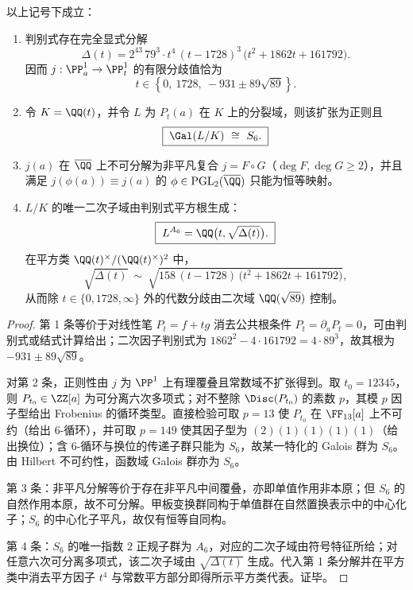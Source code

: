 \begin{theorem}\label{thm:xi-j-sextic-discriminant-s6-regular}
以上记号下成立：
\begin{enumerate}
  \item 判别式存在完全显式分解
  \[
  \boxed{\;
  \Delta(t)=2^{43}\,79^3\cdot t^{4}\,(t-1728)^{3}\,\bigl(t^2+1862t+161792\bigr).\;}
  \]
  因而 \(j:\PP^1_a\to\PP^1_t\) 的有限分歧值恰为
  \[
  t\in\left\{0,\ 1728,\ -931\pm 89\sqrt{89}\right\}.
  \]
  \item 令 \(K=\QQ(t)\)，并令 \(L\) 为 \(P_t(a)\) 在 \(K\) 上的分裂域，则该扩张为正则且
  \[
  \boxed{\;\Gal(L/K)\ \cong\ S_6.\;}
  \]
  \item \(j(a)\) 在 \(\overline{\QQ}\) 上不可分解为非平凡复合 \(j=F\circ G\)（\(\deg F,\deg G\ge2\)），并且满足 \(j(\phi(a))\equiv j(a)\) 的 \(\phi\in\mathrm{PGL}_2(\overline{\QQ})\) 只能为恒等映射。
  \item \(L/K\) 的唯一二次子域由判别式平方根生成：
  \[
  \boxed{\;L^{A_6}=\QQ\bigl(t,\sqrt{\Delta(t)}\bigr).\;}
  \]
  在平方类 \(\QQ(t)^\times/(\QQ(t)^\times)^2\) 中，
  \[
  \sqrt{\Delta(t)}\ \sim\ \sqrt{158\,(t-1728)\,\bigl(t^2+1862t+161792\bigr)},
  \]
  从而除 \(t\in\{0,1728,\infty\}\) 外的代数分歧由二次域 \(\QQ(\sqrt{89})\) 控制。
\end{enumerate}
\end{theorem}
\begin{proof}
第 1 条等价于对线性笔 \(P_t=f+t g\) 消去公共根条件 \(P_t=\partial_aP_t=0\)，可由判别式或结式计算给出；二次因子判别式为 \(1862^2-4\cdot161792=4\cdot 89^3\)，故其根为 \(-931\pm 89\sqrt{89}\)。
\par
对第 2 条，正则性由 \(j\) 为 \(\PP^1\) 上有理覆叠且常数域不扩张得到。取 \(t_0=12345\)，则 \(P_{t_0}\in\ZZ[a]\) 为可分离六次多项式；对不整除 \(\Disc(P_{t_0})\) 的素数 \(p\)，其模 \(p\) 因子型给出 Frobenius 的循环类型。直接检验可取 \(p=13\) 使 \(P_{t_0}\) 在 \(\FF_{13}[a]\) 上不可约（给出 \(6\)-循环），并可取 \(p=149\) 使其因子型为 \((2)(1)(1)(1)(1)\)（给出换位）；含 \(6\)-循环与换位的传递子群只能为 \(S_6\)，故某一特化的 Galois 群为 \(S_6\)。由 Hilbert 不可约性，函数域 Galois 群亦为 \(S_6\)。
\par
第 3 条：非平凡分解等价于存在非平凡中间覆叠，亦即单值作用非本原；但 \(S_6\) 的自然作用本原，故不可分解。甲板变换群同构于单值群在自然置换表示中的中心化子；\(S_6\) 的中心化子平凡，故仅有恒等自同构。
\par
第 4 条：\(S_6\) 的唯一指数 \(2\) 正规子群为 \(A_6\)，对应的二次子域由符号特征所给；对任意六次可分离多项式，该二次子域由 \(\sqrt{\Delta(t)}\) 生成。代入第 1 条分解并在平方类中消去平方因子 \(t^4\) 与常数平方部分即得所示平方类代表。证毕。
\end{proof}

